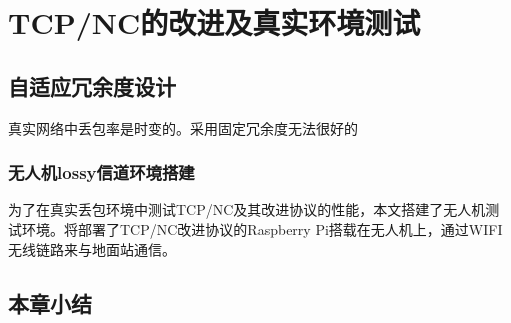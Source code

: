 \chapter{TCP/NC的改进及真实环境测试}
\section{自适应冗余度设计}
真实网络中丢包率是时变的。采用固定冗余度无法很好的 
\subsection{无人机lossy信道环境搭建}
为了在真实丢包环境中测试TCP/NC及其改进协议的性能，本文搭建了无人机测试环境。将部署了TCP/NC改进协议的Raspberry Pi搭载在无人机上，通过WIFI无线链路来与地面站通信。 
\section{本章小结 }